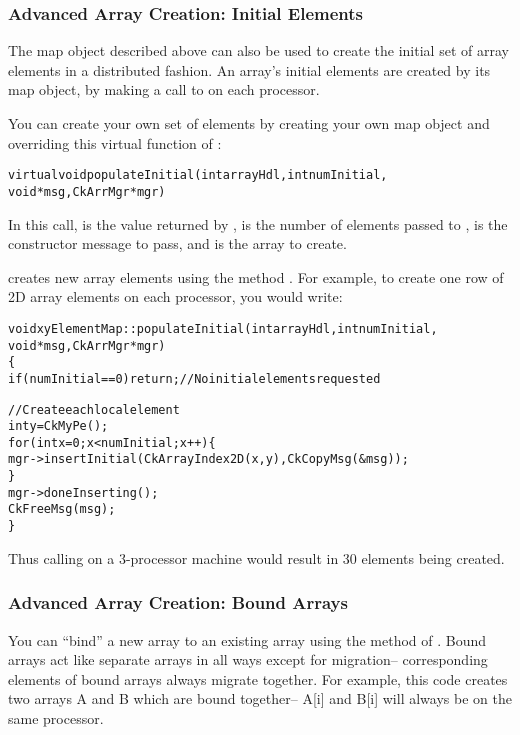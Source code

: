 \subsubsection{Advanced Array Creation: Initial Elements}
\label{array initial}

The map object described above can also be used to create
the initial set of array elements in a distributed fashion.
An array's initial elements are created by its map object,
by making a call to  on each processor.

You can create your own set of elements by creating your
own map object and overriding this virtual function of :

\begin{alltt}
  virtual void populateInitial(int arrayHdl,int numInitial,
	void *msg,CkArrMgr *mgr)
\end{alltt}

In this call,  is the value returned by ,
 is the number of elements passed to ,
 is the constructor message to pass, and  is the
array to create.

 creates new array elements using the method
.
For example, to create one row of 2D array elements on each processor,
you would write:

\begin{alltt}
void xyElementMap::populateInitial(int arrayHdl,int numInitial,
	void *msg,CkArrMgr *mgr)
\{
  if (numInitial==0) return; //No initial elements requested
	
  //Create each local element
  int y=CkMyPe();
  for (int x=0;x<numInitial;x++) \{
    mgr->insertInitial(CkArrayIndex2D(x,y),CkCopyMsg(&msg));
  \}
  mgr->doneInserting();
  CkFreeMsg(msg);
\}
\end{alltt}

Thus calling  on a 3-processor machine would result in
30 elements being created.


\subsubsection{Advanced Array Creation: Bound Arrays}
\experimental{}
 
\label{bound arrays}
You can ``bind'' a new array to an existing array
using the  method of .  Bound arrays
act like separate arrays in all ways except for migration--
corresponding elements of bound arrays always migrate together.
For example, this code creates two arrays A and B which are
bound together-- A[i] and B[i] will always be on the same processor.

